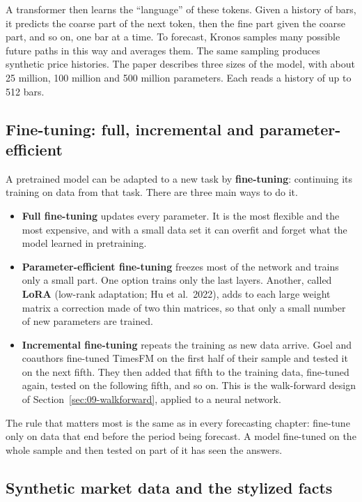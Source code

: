 A transformer then learns the ``language'' of these tokens. Given a history of bars, it predicts the coarse part of the next token, then the fine part given the coarse part, and so on, one bar at a time. To forecast, Kronos samples many possible future paths in this way and averages them. The same sampling produces synthetic price histories. The paper describes three sizes of the model, with about 25 million, 100 million and 500 million parameters. Each reads a history of up to 512 bars.

\subsection{Fine-tuning: full, incremental and parameter-efficient}

A pretrained model can be adapted to a new task by \textbf{fine-tuning}: continuing its training on data from that task. There are three main ways to do it.

\begin{itemize}
  \item \textbf{Full fine-tuning} updates every parameter. It is the most flexible and the most expensive, and with a small data set it can overfit and forget what the model learned in pretraining.
  \item \textbf{Parameter-efficient fine-tuning} freezes most of the network and trains only a small part. One option trains only the last layers. Another, called \textbf{LoRA} (low-rank adaptation; Hu et al.\ 2022), adds to each large weight matrix a correction made of two thin matrices, so that only a small number of new parameters are trained.
\item \textbf{Incremental fine-tuning} repeats the training as new data arrive. Goel and coauthors fine-tuned TimesFM on the first half of their sample and tested it on the next fifth. They then added that fifth to the training data, fine-tuned again, tested on the following fifth, and so on. This is the walk-forward design of Section~\ref{sec:09-walkforward}, applied to a neural network.
\end{itemize}

The rule that matters most is the same as in every forecasting chapter: fine-tune only on data that end before the period being forecast. A model fine-tuned on the whole sample and then tested on part of it has seen the answers.

\subsection{Synthetic market data and the stylized facts}

